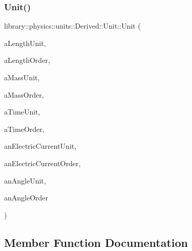 \subsubsection{\texorpdfstring{Unit()}{Unit()}}
{\footnotesize\ttfamily library\+::physics\+::units\+::\+Derived\+::\+Unit\+::\+Unit (\begin{DoxyParamCaption}\item[{const \hyperlink{classlibrary_1_1physics_1_1units_1_1_length_a3b8b39cd245cf6b19dc34459baeccb18}{Length\+::\+Unit} \&}]{a\+Length\+Unit,  }\item[{const \hyperlink{classlibrary_1_1physics_1_1units_1_1_derived_1_1_order}{Order} \&}]{a\+Length\+Order,  }\item[{const \hyperlink{classlibrary_1_1physics_1_1units_1_1_mass_a95f1e0434bc16794926b8e273bc2a54b}{Mass\+::\+Unit} \&}]{a\+Mass\+Unit,  }\item[{const \hyperlink{classlibrary_1_1physics_1_1units_1_1_derived_1_1_order}{Order} \&}]{a\+Mass\+Order,  }\item[{const \hyperlink{classlibrary_1_1physics_1_1units_1_1_time_ab876a6a05c9a2f28905f2753bfd64109}{Time\+::\+Unit} \&}]{a\+Time\+Unit,  }\item[{const \hyperlink{classlibrary_1_1physics_1_1units_1_1_derived_1_1_order}{Order} \&}]{a\+Time\+Order,  }\item[{const \hyperlink{classlibrary_1_1physics_1_1units_1_1_electric_current_a9498eabf964f0ae6116eb627b4ec5233}{Electric\+Current\+::\+Unit} \&}]{an\+Electric\+Current\+Unit,  }\item[{const \hyperlink{classlibrary_1_1physics_1_1units_1_1_derived_1_1_order}{Order} \&}]{an\+Electric\+Current\+Order,  }\item[{const \hyperlink{classlibrary_1_1physics_1_1units_1_1_angle_a3c329d415a61783b16ce481874cc5956}{Angle\+::\+Unit} \&}]{an\+Angle\+Unit,  }\item[{const \hyperlink{classlibrary_1_1physics_1_1units_1_1_derived_1_1_order}{Order} \&}]{an\+Angle\+Order }\end{DoxyParamCaption})}



\subsection{Member Function Documentation}
\mbox{\label{classlibrary_1_1physics_1_1units_1_1_derived_1_1_unit_a0371d4157e5b4995c54989bb471f4a12}} 
